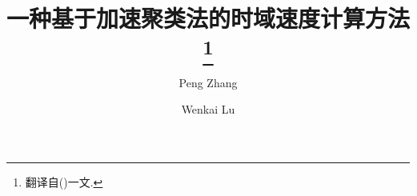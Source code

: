\documentclass[10pt, twocolumn]{ctexart}
\title{一种基于加速聚类法的时域速度计算方法\footnote{翻译自(\cite{Zhang2016})一文. }}
\author{Peng Zhang \and Wenkai Lu}
\date{}
\begin{document}
    \begin{titlepage}
        \maketitle
    \end{titlepage}

    

    

    

    

    

    

    \appendix

    

    

    

    \printbibliography
\end{document}
